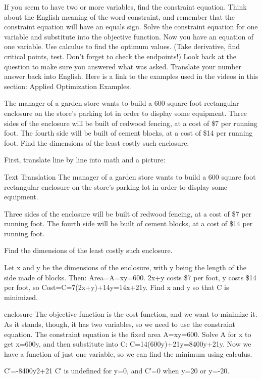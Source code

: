 If you seem to have two or more variables, find the constraint equation. Think about the English meaning of the word constraint, and remember that the constraint equation will have an equals sign.
Solve the constraint equation for one variable and substitute into the objective function. Now you have an equation of one variable.
Use calculus to find the optimum values. (Take derivative, find critical points, test. Don't forget to check the endpoints!)
Look back at the question to make sure you answered what was asked. Translate your number answer back into English.
Here is a link to the examples used in the videos in this section: Applied Optimization Examples.

\begin{example}
The manager of a garden store wants to build a 600 square foot rectangular enclosure on the store's parking lot in order to display some equipment. Three sides of the enclosure will be built of redwood fencing, at a cost of \$7 per running foot. The fourth side will be built of cement blocks, at a cost of \$14 per running foot. Find the dimensions of the least costly such enclosure.

\begin{solution} First, translate line by line into math and a picture:

Text	Translation
The manager of a garden store wants to build a 600 square foot rectangular enclosure on the store's parking lot in order to display some equipment.

Three sides of the enclosure will be built of redwood fencing, at a cost of \$7 per running foot. The fourth side will be built of cement blocks, at a cost of \$14 per running foot.

Find the dimensions of the least costly such enclosure.

Let x and y be the dimensions of the enclosure, with y being the length of the side made of blocks. Then:
Area=A=xy=600.
2x+y costs \$7 per foot, y costs \$14 per foot, so
Cost=C=7(2x+y)+14y=14x+21y.
Find x and y so that C is minimized.

enclosure
The objective function is the cost function, and we want to minimize it. As it stands, though, it has two variables, so we need to use the constraint equation. The constraint equation is the fixed area A=xy=600. Solve A for x to get x=600y, and then substitute into C:
C=14(600y)+21y=8400y+21y.
Now we have a function of just one variable, so we can find the minimum using calculus.

C′=-8400y2+21
C′ is undefined for y=0, and C′=0 when y=20 or y=-20.


\end{solution}
\end{example}
